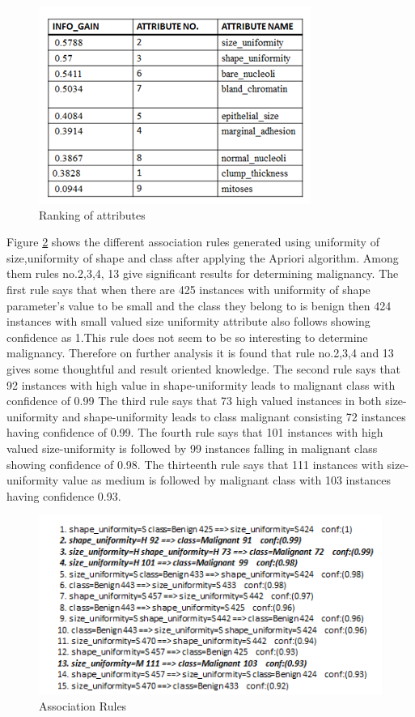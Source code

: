 \documentclass[conference]{IEEEtran}
\begin{document}
\begin{figure}[!h]
\centering
\includegraphics[scale=0.9]{rankingattributes}
\caption{Ranking of attributes}
\label{fig_rank}
\end{figure}
Figure \ref{fig_asorules}  shows the different association rules generated using  uniformity of size,uniformity of shape  and class after applying the Apriori algorithm. Among them rules no.2,3,4, 13 give significant results for determining malignancy.
The first rule says that when there are 425 instances with uniformity of shape parameter's value to be small and the class they belong to is benign then 424 instances with small valued size uniformity attribute also follows showing confidence as 1.This rule does not seem to be so interesting to determine malignancy. Therefore on further analysis it is  found that rule no.2,3,4 and 13 gives some thoughtful and result oriented knowledge.
The second rule says that 92 instances with  high value in shape-uniformity leads to malignant class with confidence of 0.99
The third rule says that 73 high valued instances in both size-uniformity and shape-uniformity leads to class malignant consisting 72 instances having confidence of 0.99.
The fourth rule says that 101 instances with high valued size-uniformity is followed by 99 instances falling in malignant class showing confidence of 0.98.
The thirteenth rule says that 111 instances with size-uniformity value as medium is followed by malignant class with 103 instances having confidence 0.93.

\begin{figure}[!h]
\centering
\includegraphics[scale=0.7]{asorules}
\caption{Association Rules}
\label{fig_asorules}
\end{figure}
\end{document}
